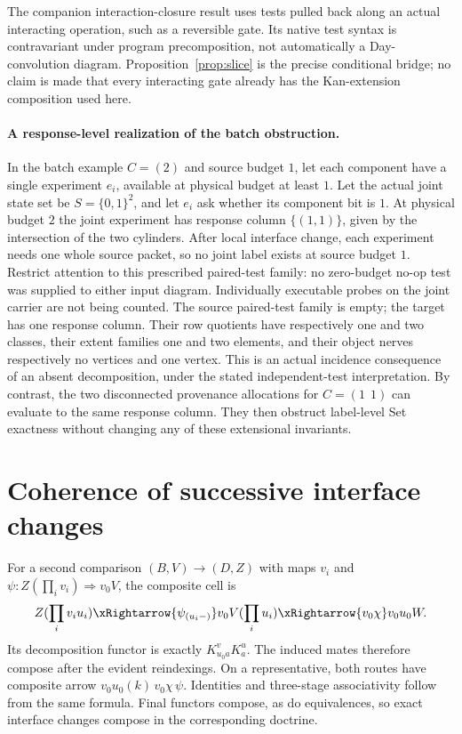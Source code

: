 The companion interaction-closure result uses tests pulled back along an
actual interacting operation, such as a reversible gate. Its native test
syntax is contravariant under program precomposition, not automatically a
Day-convolution diagram. Proposition~\ref{prop:slice} is the precise
conditional bridge; no claim is made that every interacting gate already
has the Kan-extension composition used here.


\paragraph{A response-level realization of the batch obstruction.}
In the batch example $C=(2)$ and source budget $1$, let each component
have a single experiment $e_i$, available at physical budget at least $1$.
Let the actual joint state set be $S=\{0,1\}^2$, and let $e_i$ ask
whether its component bit is $1$. At physical budget $2$ the joint
experiment has response column $\{(1,1)\}$, given by the intersection
of the two cylinders. After local interface change, each experiment needs
one whole source packet, so no joint label exists at source budget $1$.
Restrict attention to this prescribed paired-test family: no zero-budget
no-op test was supplied to either input diagram. Individually executable
probes on the joint carrier are not being counted. The source paired-test
family is empty; the target has one response column. Their row quotients have respectively one and two classes, their
extent families one and two elements, and their object nerves respectively
no vertices and one vertex. This is an actual incidence consequence of
an absent decomposition, under the stated independent-test interpretation.
By contrast, the two disconnected provenance allocations for $C=(1\ \ 1)$
can evaluate to the same response column. They then obstruct label-level
Set exactness without changing any of these extensional invariants.

\section{Coherence of successive interface changes}
For a second comparison $(B,V)\to(D,Z)$ with maps $v_i$ and
$\psi:Z(\prod_i v_i)\Rightarrow v_0V$, the composite cell is
\[
 Z(\prod_i v_i u_i)
  \xRightarrow{\psi_{(u_i-)}}v_0V(\prod_i u_i)
  \xRightarrow{v_0\chi}v_0u_0W.
\]
Its decomposition functor is exactly
$K^v_{u_0a}K^u_a$. The induced mates therefore compose after the evident
reindexings. On a representative, both routes have composite arrow
$v_0u_0(k)\,v_0\chi\,\psi$. Identities and three-stage associativity
follow from the same formula. Final functors compose, as do equivalences,
so exact interface changes compose in the corresponding doctrine.

